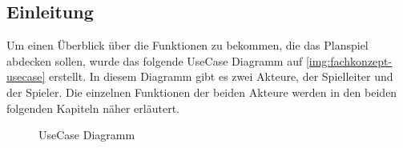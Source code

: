 \subsection{Einleitung}
\label{sec:fachkonzept-usecase-einleitung}

Um einen Überblick über die Funktionen zu bekommen, die das Planspiel abdecken sollen, wurde das folgende UseCase Diagramm auf \vref{img:fachkonzept-usecase} erstellt. In diesem Diagramm gibt es zwei Akteure, der Spielleiter und der Spieler. Die einzelnen Funktionen der beiden Akteure werden in den beiden folgenden Kapiteln näher erläutert.

\begin{figure}[htb]
  \centering
  \caption{UseCase Diagramm}
  \label{img:fachkonzept-usecase}
\end{figure}

\autorende{}